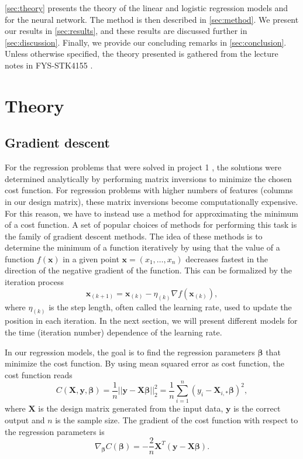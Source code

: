 \documentclass[12pt]{article}
\begin{document}
\autoref{sec:theory} presents the theory of the linear and logistic regression models and for the neural network. The method is then described in \autoref{sec:method}. We present our results in \autoref{sec:results}, and these results are discussed further in \autoref{sec:discussion}. Finally, we provide our concluding remarks in \autoref{sec:conclusion}. Unless otherwise specified, the theory presented is gathered from the lecture notes in FYS-STK4155 \cite{lecture-notes}. 

\section{Theory} \label{sec:theory}

\subsection{Gradient descent}
For the regression problems that were solved in project 1 \cite{project1-report}, the solutions were determined analytically by performing matrix inversions to minimize the chosen cost function. For regression problems with higher numbers of features (columns in our design matrix), these matrix inversions become computationally expensive. For this reason, we have to instead use a method for approximating the minimum of a cost function. A set of popular choices of methods for performing this task is the family of gradient descent methods. The idea of these methods is to determine the minimum of a function iteratively by using that the value of a function $f(\boldsymbol{x})$ in a given point $\boldsymbol{x} = (x_1, \hdots, x_n)$ decreases fastest in the direction of the negative gradient of the function. This can be formalized by the iteration process
\begin{equation}\label{eq:grad_descent}
    \boldsymbol{x}_{(k+1)} = \boldsymbol{x}_{(k)} - \eta_{(k)} \nabla f\left( \boldsymbol{x}_{(k)} \right),
\end{equation}
where $\eta_{(k)}$ is the step length, often called the learning rate, used to update the position in each iteration. In the next section, we will present different models for the time (iteration number) dependence of the learning rate.

In our regression models, the goal is to find the regression parameters $\boldsymbol{\beta}$ that minimize the cost function. By using mean squared error as cost function, the cost function reads
\begin{equation}\label{eq:mse_plain}
    C(\boldsymbol{X}, \boldsymbol{y}, \boldsymbol{\beta}) = \frac{1}{n} ||\boldsymbol{y} - \boldsymbol{X} \boldsymbol{\beta} ||_2^2 = \frac{1}{n} \sum_{i=1}^n (y_i - \boldsymbol{X}_{i,*} \boldsymbol{\beta})^2,
\end{equation}
where $\boldsymbol{X}$ is the design matrix generated from the input data, $\boldsymbol{y}$ is the correct output and $n$ is the sample size. The gradient of the cost function with respect to the regression parameters is
\begin{equation}
    \nabla_{\boldsymbol{\beta}} C (\boldsymbol{\beta}) = - \frac{2}{n} \boldsymbol{X}^T \left( \boldsymbol{y} - \boldsymbol{X} \boldsymbol{\beta} \right).
\end{equation}
\end{document}
